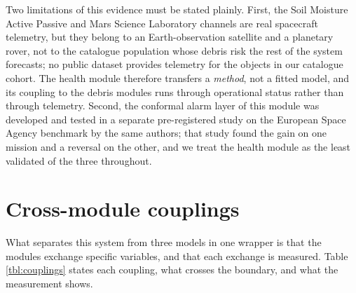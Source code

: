 \documentclass[3p,times,twocolumn]{elsarticle}
\begin{document}
Two limitations of this evidence must be stated plainly. First, the Soil
Moisture Active Passive and Mars Science Laboratory channels are real
spacecraft telemetry, but they belong to an Earth-observation satellite
and a planetary rover, not to the catalogue population whose debris risk
the rest of the system forecasts; no public dataset provides telemetry
for the objects in our catalogue cohort. The health module therefore
transfers a \emph{method}, not a fitted model, and its coupling to the
debris modules runs through operational status rather than through
telemetry. Second, the conformal alarm layer of this module was
developed and tested in a separate pre-registered study on the European
Space Agency benchmark \citep{kotowski2026esaadb} by the same authors;
that study found the gain on one mission and a reversal on the other,
and we treat the health module as the least validated of the three
throughout.

\section{Cross-module couplings}\label{sec:couplings}

What separates this system from three models in one wrapper is that the
modules exchange specific variables, and that each exchange is measured.
Table \ref{tbl:couplings} states each coupling, what crosses the
boundary, and what the measurement shows.
\end{document}
